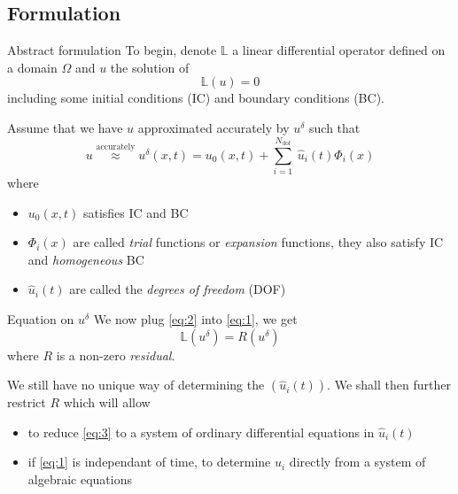 \subsection{Formulation}
\label{sec:formulation}

\begin{frame}{Abstract formulation}
  To begin, denote $\mathbb{L}$ a linear differential operator defined on a domain $\Omega$ and $u$ the solution of 
  \begin{equation}
    \label{eq:1}
    \mathbb{L} (u) = 0
  \end{equation}
  including some initial conditions (IC) and boundary conditions (BC).

  Assume that we have $u$ approximated accurately by $u^\delta$ such that
  \begin{equation}
    \label{eq:2}
    u \stackrel{\text{accurately}}{\approx}  u^{\delta }(x, t ) = u_0(x,t) + \sum_{i=1}^{N_{\text{dof}}}\ \hat{u}_i(t) \Phi_i(x)
  \end{equation}
  where 
  \begin{itemize}
  \item $u_0(x,t)$ satisfies IC and BC
  \item $\Phi_i(x)$ are called \emph{trial} functions or \emph{expansion} functions, they also  satisfy IC and \emph{homogeneous} BC
  \item $\hat{u}_i(t)$ are called the \emph{degrees of freedom} (DOF)
  \end{itemize}
\end{frame}

\begin{frame}{Equation on $u^\delta$}
  We now plug \eqref{eq:2} into \eqref{eq:1}, we get
  \begin{equation}
    \label{eq:3}
    \mathbb{L}(u^{\delta}) = R( u^{\delta} )
  \end{equation}
  where $R$ is a non-zero \emph{residual}.
  
  We still have no unique way of determining the $(\hat{u}_i(t))$. We
  shall then further restrict $R$ which will allow
  \begin{itemize}
  \item to reduce \eqref{eq:3} to a system of ordinary differential equations in $\hat{u}_i(t)$
  \item if \eqref{eq:1} is independant of time, to determine $\hat{u}_i$ directly from a system of algebraic equations
  \end{itemize}
\end{frame}


